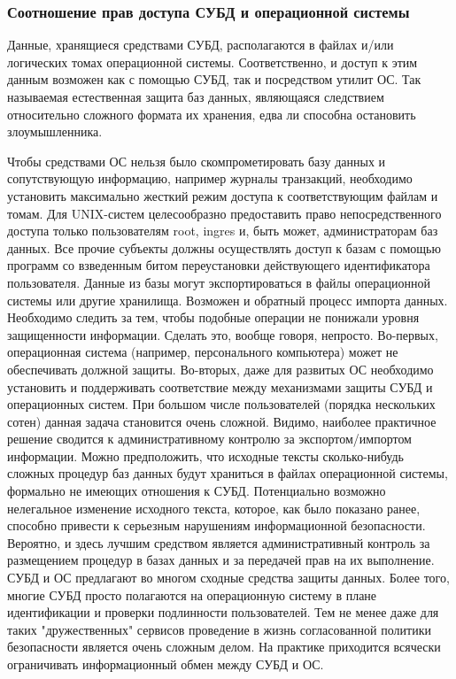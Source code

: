 \subsubsection{Соотношение прав доступа СУБД и операционной системы}
Данные, хранящиеся средствами СУБД, располагаются в файлах и/или логических томах операционной системы. Соответственно, и доступ к этим данным возможен как с помощью СУБД, так и посредством утилит ОС. Так называемая естественная защита баз данных, являющаяся следствием относительно сложного формата их хранения, едва ли способна остановить злоумышленника.

Чтобы средствами ОС нельзя было скомпрометировать базу данных и сопутствующую информацию, например журналы транзакций, необходимо установить максимально жесткий режим доступа к соответствующим файлам и томам. Для UNIX-систем целесообразно предоставить право непосредственного доступа только пользователям root, ingres и, быть может, администраторам баз данных. Все прочие субъекты должны осуществлять доступ к базам с помощью программ со взведенным битом переустановки действующего идентификатора пользователя.
Данные из базы могут экспортироваться в файлы операционной системы или другие хранилища. Возможен и обратный процесс импорта данных. Необходимо следить за тем, чтобы подобные операции не понижали уровня защищенности информации. Сделать это, вообще говоря, непросто. Во-первых, операционная система (например, персонального компьютера) может не обеспечивать должной защиты. Во-вторых, даже для развитых ОС необходимо установить и поддерживать соответствие между механизмами защиты СУБД и операционных систем. При большом числе пользователей (порядка нескольких сотен) данная задача становится очень сложной. Видимо, наиболее практичное решение сводится к административному контролю за экспортом/импортом информации.
Можно предположить, что исходные тексты сколько-нибудь сложных процедур баз данных будут храниться в файлах операционной системы, формально не имеющих отношения к СУБД. Потенциально возможно нелегальное изменение исходного текста, которое, как было показано ранее, способно привести к серьезным нарушениям информационной безопасности. Вероятно, и здесь лучшим средством является административный контроль за размещением процедур в базах данных и за передачей прав на их выполнение.
СУБД и ОС предлагают во многом сходные средства защиты данных. Более того, многие СУБД просто полагаются на операционную систему в плане идентификации и проверки подлинности пользователей. Тем не менее даже для таких "дружественных" сервисов проведение в жизнь согласованной политики безопасности является очень сложным делом. На практике приходится всячески ограничивать информационный обмен между СУБД и ОС.
